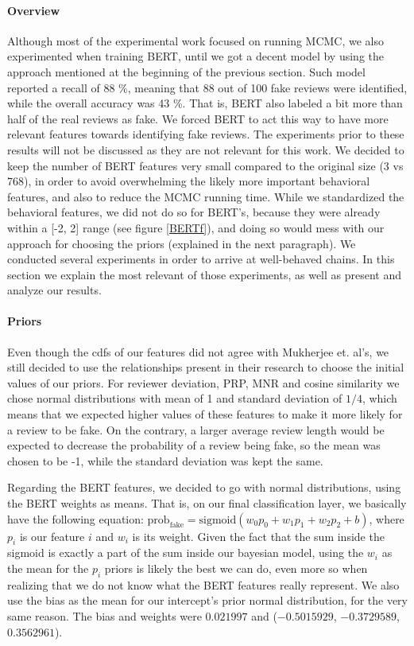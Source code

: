 \documentclass[man, floatsintext, 10pt]{apa6}
\begin{document}
\paragraph{Overview} Although most of the experimental work focused on running MCMC, we also experimented when training BERT, until we got a decent model by using the approach mentioned at the beginning of the previous section. Such model reported a recall of 88 \%, meaning that 88 out of 100 fake reviews were identified, while the overall accuracy was 43 \%. That is, BERT also labeled a bit more than half of the real reviews as fake. We forced BERT to act this way to have more relevant features towards identifying fake reviews. The experiments prior to these results will not be discussed as they are not relevant for this work. We decided to keep the number of BERT features very small compared to the original size (3 vs 768), in order to avoid overwhelming the likely more important behavioral features, and also to reduce the MCMC running time. While we standardized the behavioral features, we did not do so for BERT's, because they were already within a [-2, 2] range (see figure \ref{BERTf}), and doing so would mess with our approach for choosing the priors (explained in the next paragraph). We conducted several experiments in order to arrive at well-behaved chains. In this section we explain the most relevant of those experiments, as well as present and analyze our results. 

\vspace{2mm}

\paragraph{Priors} Even though the cdfs of our features did not agree with Mukherjee et. al's, we still decided to use the relationships present in their research to choose the initial values of our priors. For reviewer deviation, PRP, MNR and cosine similarity we chose normal distributions with mean of 1 and standard deviation of $1/4$, which means that we expected higher values of these features to make it more likely for a review to be fake. On the contrary, a larger average review length would be expected to decrease the probability of a review being fake, so the mean was chosen to be -1, while the standard deviation was kept the same.

Regarding the BERT features, we decided to go with normal distributions, using the BERT weights as means. That is, on our final classification layer, we basically have the following equation: $\text{prob}_{\text{fake}} = \text{sigmoid} (w_0 p_0 + w_1 p_1 + w_2 p_2 + b)$, where $p_i$ is our feature $i$ and $w_i$ is its weight. Given the fact that the sum inside the sigmoid is exactly a part of the sum inside our bayesian model, using the $w_i$ as the mean for the $p_i$ priors is likely the best we can do, even more so when realizing that we do not know what the BERT features really represent. We also use the bias as the mean for our intercept's prior normal distribution, for the very same reason. The bias and weights were $0.021997$ and ($-0.5015929$, $-0.3729589$, $0.3562961$). 
\end{document}
